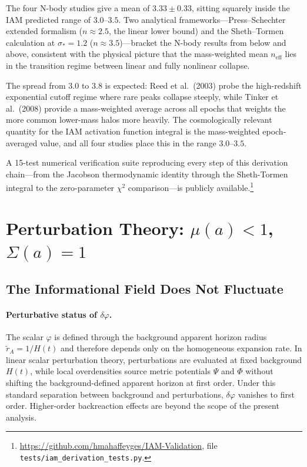 \documentclass[11pt]{article}
\begin{document}
The four N-body studies give a mean of $3.33 \pm 0.33$, sitting squarely
inside the IAM predicted range of $3.0$--$3.5$.  Two analytical
frameworks---Press--Schechter extended formalism ($n \approx 2.5$, the
linear lower bound) and the Sheth--Tormen calculation at $\sigma_* = 1.2$
($n \approx 3.5$)---bracket the N-body results from below and above,
consistent with the physical picture that the mass-weighted mean
$n_\mathrm{eff}$ lies in the transition regime between linear and fully
nonlinear collapse.

The spread from $3.0$ to $3.8$ is expected: Reed et al.\ (2003) probe the
high-redshift exponential cutoff regime where rare peaks collapse steeply,
while Tinker et al.\ (2008) provide a mass-weighted average across all
epochs that weights the more common lower-mass halos more heavily.  The
cosmologically relevant quantity for the IAM activation function integral
is the mass-weighted epoch-averaged value, and all four studies place this
in the range $3.0$--$3.5$.

A 15-test numerical verification suite reproducing every step of this
derivation chain---from the Jacobson thermodynamic identity through the
Sheth-Tormen integral to the zero-parameter $\chi^2$ comparison---is
publicly available.\footnote{%
\url{https://github.com/hmahaffeyges/IAM-Validation},
file \texttt{tests/iam\_derivation\_tests.py}.}


\section{Perturbation Theory: $\mu(a) < 1$, $\Sigma(a) = 1$}
\label{sec:perturbations}

\subsection{The Informational Field Does Not Fluctuate}

\paragraph{Perturbative status of $\delta\varphi$.}
The scalar $\varphi$ is defined through the background apparent horizon radius
$\tilde r_A = 1/H(t)$ and therefore depends only on the homogeneous expansion rate.
In linear scalar perturbation theory, perturbations are evaluated at fixed background
$H(t)$, while local overdensities source metric potentials $\Psi$ and $\Phi$
without shifting the background-defined apparent horizon at first order.
Under this standard separation between background and perturbations,
$\delta\varphi$ vanishes to first order. Higher-order backreaction effects are
beyond the scope of the present analysis.
\end{document}
